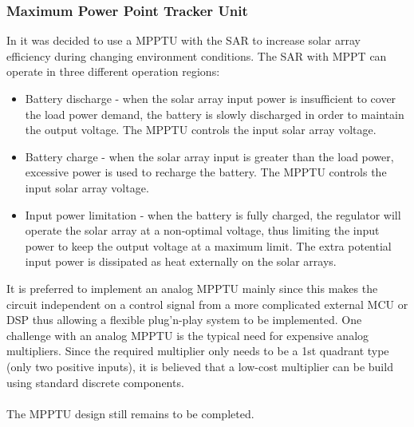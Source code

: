 \subsubsection{Maximum Power Point Tracker Unit}
\label{sec:MPPTU}
In \cite{PDR} it was decided to use a \ac{MPPTU} with the \ac{SAR} to increase solar array efficiency during changing environment conditions.
%
The \ac{SAR} with \ac{MPPT} can operate in three different operation regions:
%
\begin{itemize}
\item Battery discharge - when the solar array input power is insufficient to cover the load power demand, the battery is slowly discharged in order to maintain the output voltage. The \ac{MPPTU} controls the input solar array voltage.
\item Battery charge - when the solar array input is greater than the load power, excessive power is used to recharge the battery. The \ac{MPPTU} controls the input solar array voltage.
\item Input power limitation - when the battery is fully charged, the regulator will operate the solar array at a non-optimal voltage, thus limiting the input power to keep the output voltage at a maximum limit. The extra potential input power is dissipated as heat externally on the solar arrays.
\end{itemize}
%
It is preferred to implement an analog \ac{MPPTU} mainly since this makes the circuit independent on a control signal from a more complicated external \ac{MCU} or \ac{DSP} thus allowing a flexible plug'n-play system to be implemented. One challenge with an analog \ac{MPPTU} is the typical need for expensive analog multipliers\cite{Liang}. Since the required multiplier only needs to be a 1st quadrant type (only two positive inputs), it is believed that a low-cost multiplier can be build using standard discrete components\cite{Multiplier}.
%
\\
\\
The \ac{MPPTU} design still remains to be completed.
%
%
